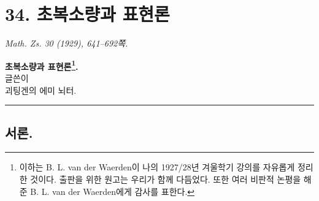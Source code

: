 
\providecommand{\mE}{\mathfrak E}
\providecommand{\mA}{\mathfrak A}
\providecommand{\mB}{\mathfrak B}
\providecommand{\mC}{\mathfrak C}
\providecommand{\mD}{\mathfrak D}
\providecommand{\mG}{\mathfrak G}
\providecommand{\mH}{\mathfrak H}
\providecommand{\mK}{\mathfrak K}
\providecommand{\mL}{\mathfrak L}
\providecommand{\mM}{\mathfrak M}
\providecommand{\mN}{\mathfrak N}
\providecommand{\mO}{\mathfrak O}
\providecommand{\mP}{\mathfrak P}
\providecommand{\mR}{\mathfrak R}
\providecommand{\mS}{\mathfrak S}
\providecommand{\mT}{\mathfrak T}
\providecommand{\mU}{\mathfrak U}
\providecommand{\mZ}{\mathfrak Z}
\providecommand{\mo}{\mathfrak o}
\providecommand{\ma}{\mathfrak a}
\providecommand{\mb}{\mathfrak b}
\providecommand{\mc}{\mathfrak c}
\providecommand{\md}{\mathfrak d}
\providecommand{\mf}{\mathfrak f}
\providecommand{\mh}{\mathfrak h}
\providecommand{\ml}{\mathfrak l}
\providecommand{\mn}{\mathfrak n}
\providecommand{\mr}{\mathfrak r}
\providecommand{\mt}{\mathfrak t}
\providecommand{\mx}{\mathfrak x}
\providecommand{\mz}{\mathfrak z}
\providecommand{\iso}{\simeq}
\providecommand{\ann}{\operatorname{Ann}}
\providecommand{\tuple}[1]{(#1)}
\providecommand{\mat}[1]{\begin{pmatrix}#1\end{pmatrix}}
\providecommand{\glqq}{“}
\providecommand{\grqq}{”}

\section*{34. 초복소량과 표현론}
\emph{Math. Zs. 30 (1929), 641--692쪽.}

\begin{center}
{\Large\bfseries 초복소량과 표현론\footnote{이하는 B. L. van der Waerden이 나의 1927/28년 겨울학기 강의를 자유롭게 정리한 것이다. 출판을 위한 원고는 우리가 함께 다듬었다. 또한 여러 비판적 논평을 해 준 B. L. van der Waerden에게 감사를 표한다.}.}\\[1em]
글쓴이\\[0.5em]
괴팅겐의 에미 뇌터.\\[0.8em]
\rule{3em}{0.4pt}
\end{center}

\subsection*{서론.}

